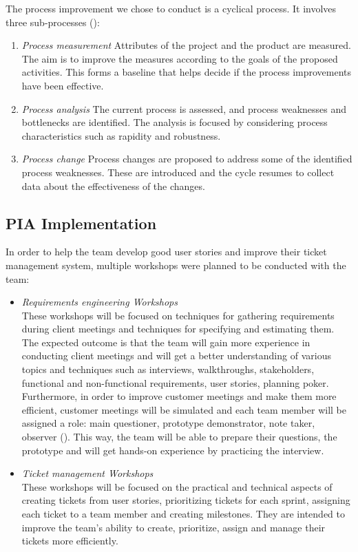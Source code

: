 \documentclass[11pt]{article}
\begin{document}
\par
The process improvement we chose to conduct is a cyclical process. It involves three sub-processes (\citet[Chapter~26]{softengbook}):
\begin{enumerate}
    \item \textit{Process measurement} Attributes of the project and the product are measured. The aim is to improve the measures according to the goals of the proposed activities. This forms a baseline that helps decide if the process improvements have been effective.
    
    \item \textit{Process analysis} The current process is assessed, and process weaknesses and bottlenecks are identified. The analysis is focused by considering process characteristics such as rapidity and robustness.
    
    \item \textit{Process change} Process changes are proposed to address some of the identified process weaknesses. These are introduced and the cycle resumes to collect data about the effectiveness of the changes.
\end{enumerate} 

\subsection*{PIA Implementation}

\par
In order to help the team develop good user stories and improve their ticket management system, multiple workshops were planned to be conducted with the team:

\begin{itemize}
    \item \textit{Requirements engineering Workshops} \\
    These workshops will be focused on techniques for gathering requirements during client meetings and techniques for specifying and estimating them. The expected outcome is that the team will gain more experience in conducting client meetings and will get a better understanding of various topics and techniques such as interviews, walkthroughs, stakeholders, functional and non-functional requirements, user stories, planning poker. Furthermore, in order to improve customer meetings and make them more efficient, customer meetings will be simulated and each team member will be assigned a role: main questioner, prototype demonstrator, note taker, observer (\citet[Chapter~4]{softengbook}). This way, the team will be able to prepare their questions, the prototype and will get hands-on experience by practicing the interview.     
    
    \item \textit{Ticket management Workshops} \\
    These workshops will be focused on the practical and technical aspects of creating tickets from user stories, prioritizing tickets for each sprint, assigning each ticket to a team member and creating milestones. They are intended to improve the team's ability to create, prioritize, assign and manage their tickets more efficiently.
\end{itemize}
\end{document}
